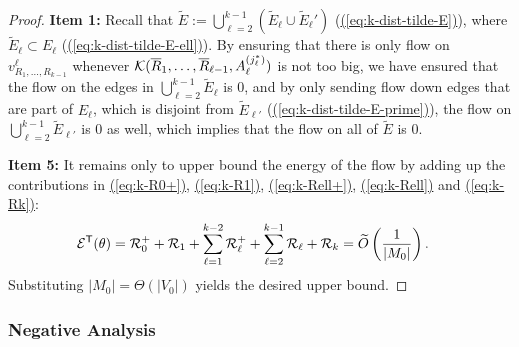 \documentclass{theoretics}
\newcommand{\eq}[1]{\hyperref[eq:#1]{(\ref*{eq:#1})}}
\renewcommand{\>}{\rangle}
\newcommand{\<}{\langle}
\renewcommand{\(}{\left(}
\renewcommand{\)}{\right)}
\begin{document}
\begin{proof}
\vskip7pt
\noindent\textbf{Item 1:} Recall that $\tilde{E}:=\bigcup_{\ell=2}^{k-1}(\tilde{E}_{\ell}\cup\tilde{E}_{\ell}')$ (\eq{k-dist-tilde-E}), where $\tilde{E}_{\ell}\subset E_{\ell}$ (\eq{k-dist-tilde-E-ell}). By ensuring that there is only flow on $v^{\ell}_{R_1,\dots,R_{k-1}}$ whenever ${\cal K}(\overline{R}_1,\dots,\overline{R}_{\ell-1},A_{\ell}^{(j_{\ell}^*)})$ is not too big, we have ensured that the flow on the edges in $\bigcup_{\ell=2}^{k-1}\tilde{E}_{\ell}$ is 0, and by only sending flow down edges that are part of $E_{\ell}$, which is disjoint from $\tilde{E}_{\ell'}$ (\eq{k-dist-tilde-E-prime}), the flow on $\bigcup_{\ell=2}^{k-1}\tilde{E}_{\ell'}$ is 0 as well, which implies that the flow on all of $\tilde{E}$ is 0.


\vskip7pt	
\noindent\textbf{Item 5:} It remains only to upper bound the energy of the flow by adding up the contributions in \eq{k-R0+}, \eq{k-R1}, \eq{k-Rell+}, \eq{k-Rell} and \eq{k-Rk}:
		\begin{align*}
			{\cal E}^{\sf T}(\theta) &={\cal R}_0^++{\cal R}_1+\sum_{\ell=1}^{k-2}{\cal R}_{\ell}^++\sum_{\ell=2}^{k-1}{\cal R}_{\ell}+{\cal R}_k
=
\widetilde{O}\left(\frac{1}{|M_0|}\right).
		\end{align*}
		Substituting $|M_0|=\Theta(|V_0|)$ yields the desired upper bound.
\end{proof}

\subsubsection{Negative Analysis}
\end{document}
